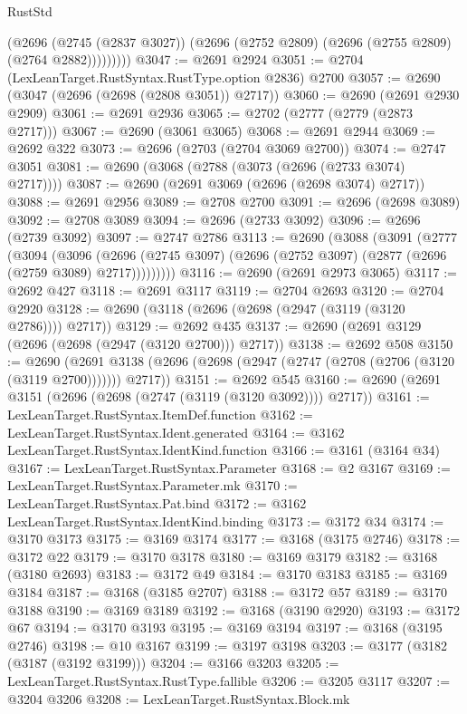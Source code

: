 \begin{lexlean}{RustStd}
\begin{coremodule}
              (@2696
                (@2745 (@2837 @3027))
                (@2696 (@2752 @2809) (@2696 (@2755 @2809) (@2764 @2882)))))))))
@3047 := @2691 @2924
@3051 := @2704 (LexLeanTarget.RustSyntax.RustType.option @2836) @2700
@3057 := @2690 (@3047 (@2696 (@2698 (@2808 @3051)) @2717))
@3060 := @2690 (@2691 @2930 @2909)
@3061 := @2691 @2936
@3065 := @2702 (@2777 (@2779 (@2873 @2717)))
@3067 := @2690 (@3061 @3065)
@3068 := @2691 @2944
@3069 := @2692 @322
@3073 := @2696 (@2703 (@2704 @3069 @2700))
@3074 := @2747 @3051
@3081 := @2690 (@3068 (@2788 (@3073 (@2696 (@2733 @3074) @2717))))
@3087 := @2690 (@2691 @3069 (@2696 (@2698 @3074) @2717))
@3088 := @2691 @2956
@3089 := @2708 @2700
@3091 := @2696 (@2698 @3089)
@3092 := @2708 @3089
@3094 := @2696 (@2733 @3092)
@3096 := @2696 (@2739 @3092)
@3097 := @2747 @2786
@3113 := @2690
    (@3088
      (@3091
        (@2777
          (@3094
            (@3096
              (@2696 (@2745 @3097) (@2696 (@2752 @3097) (@2877 (@2696 (@2759 @3089) @2717)))))))))
@3116 := @2690 (@2691 @2973 @3065)
@3117 := @2692 @427
@3118 := @2691 @3117
@3119 := @2704 @2693
@3120 := @2704 @2920
@3128 := @2690 (@3118 (@2696 (@2698 (@2947 (@3119 (@3120 @2786)))) @2717))
@3129 := @2692 @435
@3137 := @2690 (@2691 @3129 (@2696 (@2698 (@2947 (@3120 @2700))) @2717))
@3138 := @2692 @508
@3150 := @2690
    (@2691 @3138 (@2696 (@2698 (@2947 (@2747 (@2708 (@2706 (@3120 (@3119 @2700))))))) @2717))
@3151 := @2692 @545
@3160 := @2690 (@2691 @3151 (@2696 (@2698 (@2747 (@3119 (@3120 @3092)))) @2717))
@3161 := LexLeanTarget.RustSyntax.ItemDef.function
@3162 := LexLeanTarget.RustSyntax.Ident.generated
@3164 := @3162 LexLeanTarget.RustSyntax.IdentKind.function
@3166 := @3161 (@3164 @34)
@3167 := LexLeanTarget.RustSyntax.Parameter
@3168 := @2 @3167
@3169 := LexLeanTarget.RustSyntax.Parameter.mk
@3170 := LexLeanTarget.RustSyntax.Pat.bind
@3172 := @3162 LexLeanTarget.RustSyntax.IdentKind.binding
@3173 := @3172 @34
@3174 := @3170 @3173
@3175 := @3169 @3174
@3177 := @3168 (@3175 @2746)
@3178 := @3172 @22
@3179 := @3170 @3178
@3180 := @3169 @3179
@3182 := @3168 (@3180 @2693)
@3183 := @3172 @49
@3184 := @3170 @3183
@3185 := @3169 @3184
@3187 := @3168 (@3185 @2707)
@3188 := @3172 @57
@3189 := @3170 @3188
@3190 := @3169 @3189
@3192 := @3168 (@3190 @2920)
@3193 := @3172 @67
@3194 := @3170 @3193
@3195 := @3169 @3194
@3197 := @3168 (@3195 @2746)
@3198 := @10 @3167
@3199 := @3197 @3198
@3203 := @3177 (@3182 (@3187 (@3192 @3199)))
@3204 := @3166 @3203
@3205 := LexLeanTarget.RustSyntax.RustType.fallible
@3206 := @3205 @3117
@3207 := @3204 @3206
@3208 := LexLeanTarget.RustSyntax.Block.mk

\end{coremodule}
\end{lexlean}

